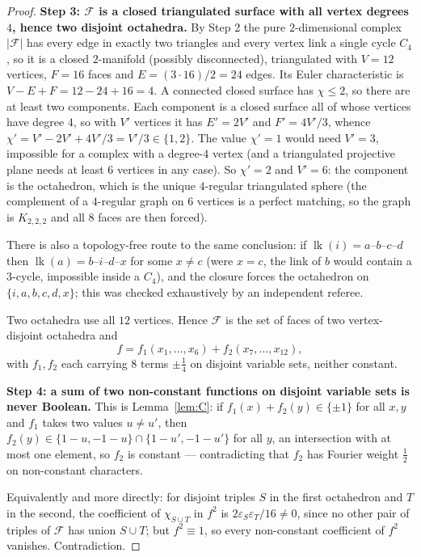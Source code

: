 \documentclass[11pt,reqno]{amsart}
\theoremstyle{plain}
\theoremstyle{definition}
\numberwithin{theorem}{section}
\newcommand{\lk}{\operatorname{lk}}
\newcommand{\eps}{\varepsilon}
\begin{document}
\begin{proof}
\smallskip\noindent\textbf{Step 3: $\mathcal{F}$ is a closed triangulated surface with all
vertex degrees $4$, hence two disjoint octahedra.}
By Step 2 the pure $2$-dimensional complex $|\mathcal{F}|$ has every edge in exactly two
triangles and every vertex link a single cycle $C_4$, so it is a closed $2$-manifold (possibly
disconnected), triangulated with $V = 12$ vertices, $F = 16$ faces and
$E = (3 \cdot 16)/2 = 24$ edges. Its Euler characteristic is $V - E + F = 12 - 24 + 16 = 4$. A
connected closed surface has $\chi \le 2$, so there are at least two components. Each component
is a closed surface all of whose vertices have degree $4$, so with $V'$ vertices it has
$E' = 2V'$ and $F' = 4V'/3$, whence $\chi' = V' - 2V' + 4V'/3 = V'/3 \in \{1, 2\}$. The value
$\chi' = 1$ would need $V' = 3$, impossible for a complex with a degree-$4$ vertex (and a
triangulated projective plane needs at least $6$ vertices in any case). So $\chi' = 2$ and
$V' = 6$: the component is the octahedron, which is the unique $4$-regular triangulated sphere
(the complement of a $4$-regular graph on $6$ vertices is a perfect matching, so the graph is
$K_{2,2,2}$ and all $8$ faces are then forced).

There is also a topology-free route to the same conclusion: if $\lk(i) = a$--$b$--$c$--$d$ then
$\lk(a) = b$--$i$--$d$--$x$ for some $x \ne c$ (were $x = c$, the link of $b$ would contain a
$3$-cycle, impossible inside a $C_4$), and the closure forces the octahedron on
$\{i,a,b,c,d,x\}$; this was checked exhaustively by an independent referee.

Two octahedra use all $12$ vertices. Hence $\mathcal{F}$ is the set of faces of two
vertex-disjoint octahedra and
\[
  f = f_1(x_1,\dots,x_6) + f_2(x_7,\dots,x_{12}),
\]
with $f_1, f_2$ each carrying $8$ terms $\pm\frac14$ on disjoint variable sets, neither
constant.

\smallskip\noindent\textbf{Step 4: a sum of two non-constant functions on disjoint variable sets
is never Boolean.}
This is Lemma~\ref{lem:C}: if $f_1(x) + f_2(y) \in \{\pm1\}$ for all $x, y$ and $f_1$ takes two
values $u \ne u'$, then $f_2(y) \in \{1-u,-1-u\} \cap \{1-u',-1-u'\}$ for all $y$, an
intersection with at most one element, so $f_2$ is constant --- contradicting that $f_2$ has
Fourier weight $\frac12$ on non-constant characters.

Equivalently and more directly: for disjoint triples $S$ in the first octahedron and $T$ in the
second, the coefficient of $\chi_{S \cup T}$ in $f^2$ is $2\eps_S\eps_T/16 \ne 0$, since no
other pair of triples of $\mathcal{F}$ has union $S \cup T$; but $f^2 \equiv 1$, so every
non-constant coefficient of $f^2$ vanishes. Contradiction.
\end{proof}
\end{document}
